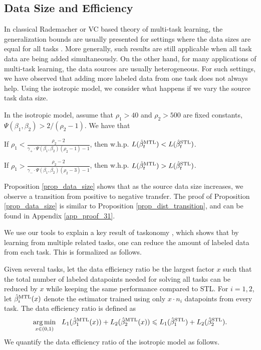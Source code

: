 \subsection{Data Size and Efficiency}
In classical Rademacher or VC based theory of multi-task learning, the generalization bounds are usually presented for settings where the data sizes are equal for all tasks \cite{B00,M06,MPR16}.
More generally, such results are still applicable when all task data are being added simultaneously.
On the other hand, for many applications of multi-task learning, the data sources are usually heterogeneous.
For such settings, we have observed that adding more labeled data from one task does not always help.
Using the isotropic model, we consider what happens if we vary the source task data size.

\begin{proposition}\label{prop_data_size}
	In the isotropic model, assume that $\rho_1 > 40$ and $\rho_2 > 500$ are fixed constants, $\Psi(\beta_1, \beta_2) > 2/(\rho_2 - 1)$.
	We have that
	\squishlist
		\item If $\rho_1 < \frac{\rho_2-2}{\gamma_+ \cdot \Psi(\beta_1, \beta_2) (\rho_2 - 1) - 1}$, then w.h.p. $L(\hat{\beta}_t^{\text{MTL}}) < L(\hat{\beta}_t^{\text{STL}})$.
		\item If $\rho_1 > \frac{\rho_2-2}{\gamma_- \cdot \Psi(\beta_1, \beta_2) (\rho_2 - 3) - 1}$, then w.h.p. $L(\hat{\beta}_t^{\text{MTL}}) > L(\hat{\beta}_t^{\text{STL}})$.
	\squishend
\end{proposition}
Proposition \ref{prop_data_size} shows that as the source data size increases, we observe a transition from positive to negative transfer.
The proof of Proposition \ref{prop_data_size} is similar to Proposition \ref{prop_dist_transition}, and can be found in Appendix \ref{app_proof_31}.


We use our tools to explain a key result of taskonomy \cite{ZSSGM18}, which shows that by learning from multiple related tasks, one can reduce the amount of labeled data from each task.
This is formalized as follows.

Given several tasks, let the data efficiency ratio be the largest factor $x$ such that the total number of labeled datapoints needed for solving all tasks can be reduced by $x$ while keeping the same performance compared to STL.
For $i = 1, 2$, let $\hat{\beta}_i^{\text{MTL}}(x)$ denote the estimator trained using only $x \cdot n_i$ datapoints from every task.
The data efficiency ratio is defined as
\[ \operatorname*{arg\,min}_{x\in(0, 1)} ~~
		L_1(\hat{\beta}_1^{\text{MTL}}(x)) + L_2(\hat{\beta}_2^{\text{MTL}}(x))
		\leqslant L_1(\hat{\beta}_1^{\text{STL}}) + L_2(\hat{\beta}_2^{\text{STL}}). \]
We quantify the data efficiency ratio of the isotropic model as follows.

